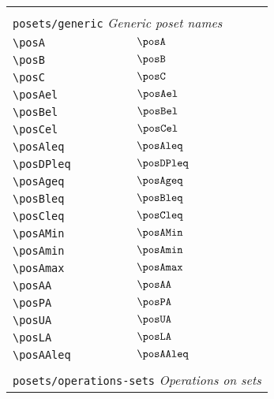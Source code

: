 \begin{longtable}{lll}
\hline
 &  & \\ 
 \multicolumn{3}{l}{{\color[rgb]{0.5,0.5,0.5}\texttt{posets/generic}} \emph{Generic poset names}}\\ 
 \hline
{\color[rgb]{0.5,0.5,0.5}\texttt{\textbackslash posA}} & $\posA$ & \\ 
 {\color[rgb]{0.5,0.5,0.5}\texttt{\textbackslash posB}} & $\posB$ & \\ 
 {\color[rgb]{0.5,0.5,0.5}\texttt{\textbackslash posC}} & $\posC$ & \\ 
 {\color[rgb]{0.5,0.5,0.5}\texttt{\textbackslash posAel}} & $\posAel$ & \\ 
 {\color[rgb]{0.5,0.5,0.5}\texttt{\textbackslash posBel}} & $\posBel$ & \\ 
 {\color[rgb]{0.5,0.5,0.5}\texttt{\textbackslash posCel}} & $\posCel$ & \\ 
 {\color[rgb]{0.5,0.5,0.5}\texttt{\textbackslash posAleq}} & $\posAleq$ & \\ 
 {\color[rgb]{0.5,0.5,0.5}\texttt{\textbackslash posDPleq}} & $\posDPleq$ & \\ 
 {\color[rgb]{0.5,0.5,0.5}\texttt{\textbackslash posAgeq}} & $\posAgeq$ & \\ 
 {\color[rgb]{0.5,0.5,0.5}\texttt{\textbackslash posBleq}} & $\posBleq$ & \\ 
 {\color[rgb]{0.5,0.5,0.5}\texttt{\textbackslash posCleq}} & $\posCleq$ & \\ 
 {\color[rgb]{0.5,0.5,0.5}\texttt{\textbackslash posAMin}} & $\posAMin$ & \\ 
 {\color[rgb]{0.5,0.5,0.5}\texttt{\textbackslash posAmin}} & $\posAmin$ & \\ 
 {\color[rgb]{0.5,0.5,0.5}\texttt{\textbackslash posAmax}} & $\posAmax$ & \\ 
 {\color[rgb]{0.5,0.5,0.5}\texttt{\textbackslash posAA}} & $\posAA$ & \\ 
 {\color[rgb]{0.5,0.5,0.5}\texttt{\textbackslash posPA}} & $\posPA$ & \\ 
 {\color[rgb]{0.5,0.5,0.5}\texttt{\textbackslash posUA}} & $\posUA$ & \\ 
 {\color[rgb]{0.5,0.5,0.5}\texttt{\textbackslash posLA}} & $\posLA$ & \\ 
 {\color[rgb]{0.5,0.5,0.5}\texttt{\textbackslash posAAleq}} & $\posAAleq$ & \\ 
  &  & \\ 
 \multicolumn{3}{l}{{\color[rgb]{0.5,0.5,0.5}\texttt{posets/operations-sets}} \emph{Operations on sets}}\\ 

\end{longtable}
